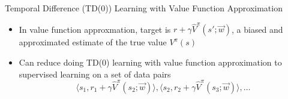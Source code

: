 \begin{frame}[c]{Temporal Difference (TD(0)) Learning with Value
		Function Approximation}
	
	\begin{itemize}
		\item In value function approxmation, target is $r + \gamma \hat{V}^\pi (s'; \vec{w})$, a biased and approximated estimate of the true value $V^\pi(s)$
		\item Can reduce doing TD(0) learning with value function approximation to supervised learning on a set of data pairs
		$$\langle  s_1, r_1+ \gamma \hat{V}^\pi (s_2; \vec{w}) \rangle, \langle  s_2, r_2+ \gamma \hat{V}^\pi (s_3; \vec{w}) \rangle, \ldots $$
	\end{itemize}
	
\end{frame}

